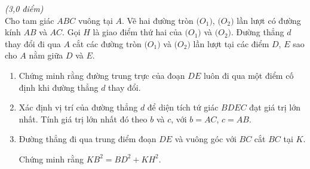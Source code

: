 \begin{ex}%
	{\it{(3,0 điểm)}}\\
	Cho tam giác $ABC$ vuông tại $A$. Vẽ hai đường tròn $\big(O_1\big)$, $\big(O_2\big)$ lần lượt có đường kính $AB$ và $AC$. Gọi $H$ là giao điểm thứ hai của $\big(O_1\big)$ và $\big(O_2\big)$. Đường thẳng $d$ thay đổi đi qua $A$ cắt các đường tròn $\big(O_1\big)$ và $\big(O_2\big)$ lần lượt tại các điểm $D$, $E$ sao cho $A$ nằm giữa $D$ và $E$.
	\begin{enumerate}	
		\item Chứng minh rằng đường trung trực của đoạn $DE$ luôn đi qua một điểm cố định khi đường thẳng $d$ thay đổi.
		\item  Xác định vị trí của đường thẳng $d$ để diện tích tứ giác $BDEC$ đạt giá trị lớn nhất. Tính giá trị lớn nhất đó theo $b$ và $c$, với $b = AC$, $c = AB$. 
		\item Đường thẳng đi qua trung điểm đoạn $DE$ và vuông góc với $BC$ cắt $BC$ tại $K$. 
		
		Chứng minh rằng $KB^2 = BD^2 + KH^2$.
	\end{enumerate}
\end{ex}
